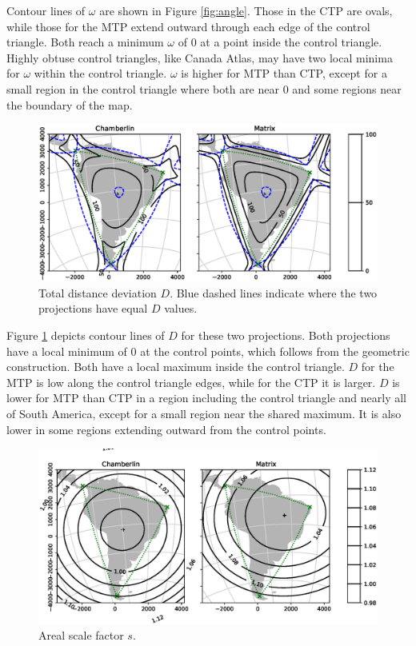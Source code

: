 \documentclass[]{interact}
\begin{document}
Contour lines of $\omega$ are shown in Figure \ref{fig:angle}. Those in the CTP
are ovals, while those for the MTP extend outward through each edge of the
control triangle. Both reach a minimum $\omega$ of 0 at a point inside the
control triangle. Highly obtuse control triangles, like Canada Atlas, may have
two local minima for $\omega$ within the control triangle. $\omega$ is higher
for MTP than CTP, except for a small region in the control triangle where both
are near 0 and some regions near the boundary of the map.

\begin{figure}
  \includegraphics[width=\textwidth]{SA_Wall_Map_distance}
  \caption{Total distance deviation $D$. Blue dashed lines
  indicate where the two projections have equal $D$ values.}
  \label{fig:distance}
\end{figure}

Figure \ref{fig:distance} depicts contour lines of $D$ for these two
projections. Both projections have a local minimum of 0 at the control points,
which follows from the geometric construction. Both have a local maximum inside
the control triangle. $D$ for the MTP is low along the control
triangle edges, while for the CTP it is larger. $D$ is
lower for MTP than CTP in a region including the control triangle and
nearly all of South America, except for a small region near the shared maximum.
It is also lower in some regions extending outward from the control points.

\begin{figure}
  \includegraphics[width=\textwidth]{SA_Wall_Map_scale}
  \caption{Areal scale factor $s$.}
  \label{fig:scale}
\end{figure}
\end{document}
